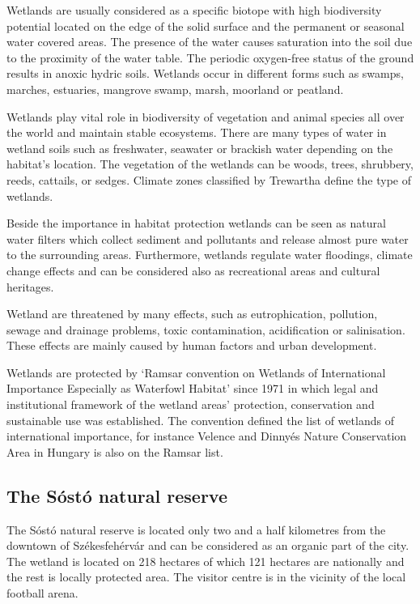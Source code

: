 \documentclass[conference]{IEEEtran}
\begin{document}
Wetlands are usually considered as a specific biotope with high biodiversity
potential located on the edge of the solid surface and the permanent or
seasonal water covered areas. The presence of the water causes saturation into
the soil due to the proximity of the water table. The periodic oxygen-free
status of the ground results in anoxic hydric soils. Wetlands occur in
different forms such as swamps, marches, estuaries, mangrove swamp, marsh,
moorland or peatland.

Wetlands play vital role in biodiversity of vegetation and animal species all
over the world and maintain stable ecosystems. There are many types of water in
wetland soils such as freshwater, seawater or brackish water depending on the
habitat’s location. The vegetation of the wetlands can be woods, trees,
shrubbery, reeds, cattails, or sedges. Climate zones classified by Trewartha
define the type of wetlands.

Beside the importance in habitat protection wetlands can be seen as natural
water filters which collect sediment and pollutants and release almost pure
water to the surrounding areas. Furthermore, wetlands regulate water floodings,
climate change effects and can be considered also as recreational areas and
cultural heritages.

Wetland are threatened by many effects, such as eutrophication, pollution,
sewage and drainage problems, toxic contamination, acidification or
salinisation. These effects are mainly caused by human factors and urban
development.

Wetlands are protected by ‘Ramsar convention on Wetlands of International
Importance Especially as Waterfowl Habitat’ since 1971 in which legal and
institutional framework of the wetland areas’ protection, conservation and
sustainable use was established. The convention defined the list of wetlands of
international importance, for instance Velence and Dinnyés Nature Conservation
Area in Hungary is also on the Ramsar list.

\subsection{The Sóstó natural reserve}

The Sóstó natural reserve is located only two and a half kilometres from the
downtown of Székesfehérvár and can be considered as an organic part of the
city. The wetland is located on 218 hectares of which 121 hectares are
nationally and the rest is locally protected area. The visitor centre is in the
vicinity of the local football arena.
\end{document}
